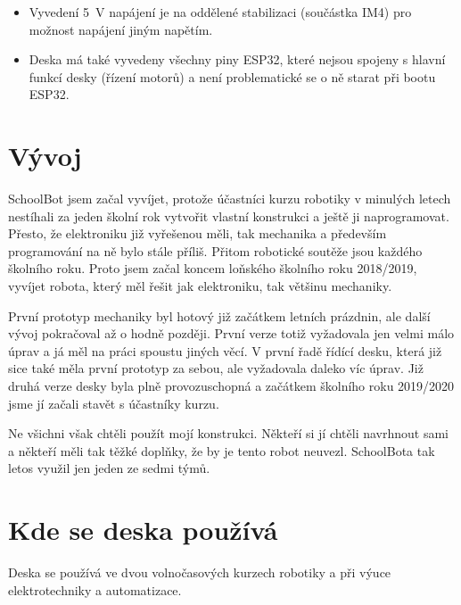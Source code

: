 \documentclass{template/socthesis}
\begin{document}
\begin{itemize}
	\item Vyvedení 5~V napájení je na oddělené stabilizaci (součástka IM4) pro možnost napájení jiným napětím.
	
	\item Deska má také vyvedeny všechny piny ESP32, které nejsou spojeny 
	s hlavní funkcí desky (řízení motorů) a není problematické se o ně starat při bootu ESP32.
	
	\end{itemize}
\section{Vývoj}

SchoolBot jsem začal vyvíjet, protože účastníci kurzu robotiky v minulých letech nestíhali za jeden školní rok vytvořit vlastní konstrukci a ještě ji naprogramovat. Přesto, že elektroniku již vyřešenou měli, tak mechanika a především programování na ně bylo stále příliš. Přitom robotické soutěže jsou  každého školního roku. Proto jsem začal koncem loňského školního roku 2018/2019, vyvíjet robota, který měl řešit jak elektroniku, tak většinu mechaniky. 

První prototyp mechaniky byl hotový již začátkem letních prázdnin, ale další vývoj pokračoval až o hodně později. První verze totiž vyžadovala jen velmi málo úprav a já měl na práci spoustu jiných věcí. V první řadě řídící desku, která již sice také měla první prototyp za sebou, ale vyžadovala daleko víc úprav. Již druhá verze desky byla plně provozuschopná a začátkem školního roku 2019/2020 jsme jí začali stavět s účastníky kurzu.

 Ne všichni však chtěli použít mojí konstrukci. Někteří si jí chtěli navrhnout sami a někteří měli tak těžké doplňky, že by je tento robot neuvezl. 
SchoolBota tak letos využil jen jeden ze sedmi týmů.

\section{Kde se deska používá}
Deska se používá ve dvou volnočasových kurzech robotiky a při výuce elektrotechniky a automatizace.

\newpage
\end{document}
